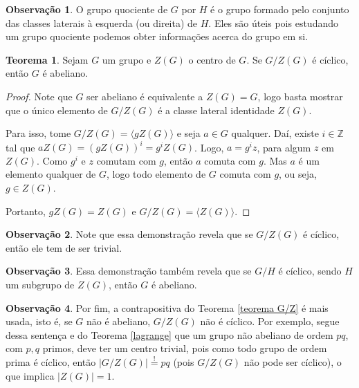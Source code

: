\documentclass[a4paper,portuguese,11pt,twoside, leqno]{book}
\theoremstyle{definition}
\newtheorem{theorem}{Teorema}[section]
\newtheorem{remark}{Observação}[section]
\begin{document}
	\begin{remark}
		O grupo quociente de $G$ por $H$ é o grupo formado pelo conjunto das classes laterais à esquerda (ou direita) de $H$. Eles são úteis pois estudando um grupo quociente podemos obter informações acerca do grupo em si.
	\end{remark}
	
	\begin{theorem}
		\label{teorema G/Z}
		Sejam $G$ um grupo e $Z(G)$ o centro de $G$. Se $G/Z(G)$ é cíclico, então $G$ é abeliano.
	\end{theorem}
	
	\begin{proof}
		Note que $G$ ser abeliano é equivalente a $Z(G) = G$, logo basta mostrar que o único elemento de $G/Z(G)$ é a classe lateral identidade $Z(G)$.
		\par\vspace{0.3cm} Para isso, tome $G/Z(G) = \langle gZ(G) \rangle$ e seja $a\in G$ qualquer. Daí, existe $i\in\mathbb{Z}$ tal que $aZ(G) = (gZ(G))^i = g^iZ(G)$. Logo, $a = g^iz$, para algum $z$ em $Z(G)$. Como $g^i$ e $z$ comutam com $g$, então $a$ comuta com $g$. Mas $a$ é um elemento qualquer de $G$, logo todo elemento de $G$ comuta com $g$, ou seja, $g\in Z(G)$.
		\par\vspace{0.3cm} Portanto, $gZ(G) = Z(G)$ e $G/Z(G) = \langle Z(G) \rangle$.
	\end{proof}
	
	\begin{remark}
		Note que essa demonstração revela que se $G/Z(G)$ é cíclico, então ele tem de ser trivial.
	\end{remark}
	
	\begin{remark}
		Essa demonstração também revela que se $G/H$ é cíclico, sendo $H$ um subgrupo de $Z(G)$, então $G$ é abeliano.
	\end{remark}
	
	\begin{remark}
		Por fim, a contrapositiva do Teorema \eqref{teorema G/Z} é mais usada, isto é, se $G$ não é abeliano, $G/Z(G)$ não é cíclico. Por exemplo, segue dessa sentença e do Teorema \eqref{lagrange} que um grupo não abeliano de ordem $pq$, com $p, q$ primos, deve ter um centro trivial, pois como todo grupo de ordem prima é cíclico, então $|G/Z(G)| \overset{!}{=} pq$ (pois $G/Z(G)$ não pode ser cíclico), o que implica $|Z(G)| = 1$. 
	\end{remark}
	
\end{document}
